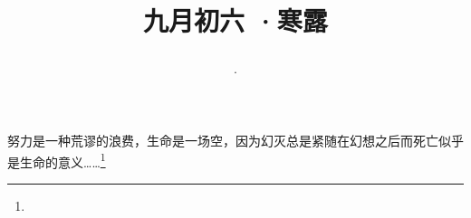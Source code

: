 \title{\date[d=8,m=10,y=2024][year:cn-y,年,month:cn,day:cn,日,·,weekday]·九月初六 ·寒露}
努力是一种荒谬的浪费，生命是一场空，因为幻灭总是紧随在幻想之后而死亡似乎是生命的意义……\footnote{ }

